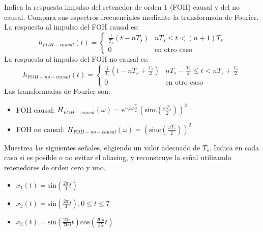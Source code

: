 \documentclass[10pt,twoside,spanish,a4paper]{article}
\begin{document}
\begin{itemize}
		\itemP Indica la respuesta impulso del retenedor de orden 1 (FOH) causal y del no causal. Compara sus espectros frecuenciales mediante
		la transformada de Fourier.
		La respuesta al impulso del FOH causal es:
		\[h_{FOH-causal}(t) = \left\{ \begin{array}{ll}
		\frac{1}{T_s}\left(t - nT_s\right) & nT_s \leq t < (n+1)T_s \\
		0 & \text{en otro caso}
		\end{array} \right.\]
		La respuesta al impulso del FOH no causal es:
		\[h_{FOH-no-causal}(t) = \left\{ \begin{array}{ll}
		\frac{1}{T_s}\left(t - nT_s + \frac{T_s}{2}\right) & nT_s - \frac{T_s}{2} \leq t < nT_s + \frac{T_s}{2} \\
		0 & \text{en otro caso}
		\end{array} \right.\]
		Las transformadas de Fourier son:
		\begin{itemize}
			\item FOH causal: $H_{FOH-causal}(\omega) = \mathrm{e}^{-j\omega \frac{T_s}{2}} \left(\mathrm{sinc}\left(\frac{\omega T_s}{2}\right)\right)^2$
			\item FOH no causal: $H_{FOH-no-causal}(\omega) = \left(\mathrm{sinc}\left(\frac{\omega T_s}{2}\right)\right)^2$
		\end{itemize}

		\itemP Muestrea las siguientes señales, eligiendo un valor adecuado de $T_s$. Indica en cada caso si es posible o no 
		evitar el aliasing, y reconstruye la señal utilizando retenedores de orden cero y uno.
		\begin{itemize}
			\item $x_1(t)=\mathrm{sin}(\frac{2\pi}{4} t)$
			\item $x_2(t)=\mathrm{sin}(\frac{2\pi}{4} t), 0\leq t\leq 7$
			\item $x_3(t)=\mathrm{sin}(\frac{20\pi}{700}t)\mathrm{cos}(\frac{20\pi}{35}t)$
		\end{itemize}


\end{itemize}
\end{document}
